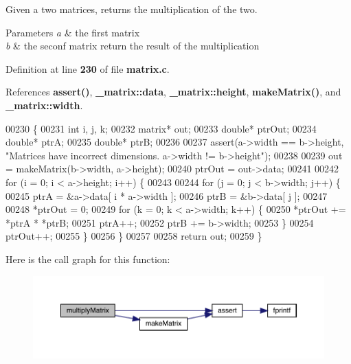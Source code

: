 Given a two matrices, returns the multiplication of the two. 


\begin{DoxyParams}{Parameters}
{\em a} & the first matrix \\
\hline
{\em b} & the seconf matrix return the result of the multiplication \\
\hline
\end{DoxyParams}


Definition at line \textbf{ 230} of file \textbf{ matrix.\+c}.



References \textbf{ assert()}, \textbf{ \+\_\+matrix\+::data}, \textbf{ \+\_\+matrix\+::height}, \textbf{ make\+Matrix()}, and \textbf{ \+\_\+matrix\+::width}.


\begin{DoxyCode}
00230                                              \{
00231     \textcolor{keywordtype}{int} i, j, k;
00232     matrix* out;
00233     \textcolor{keywordtype}{double}* ptrOut;
00234     \textcolor{keywordtype}{double}* ptrA;
00235     \textcolor{keywordtype}{double}* ptrB;
00236 
00237     assert(a->width == b->height, \textcolor{stringliteral}{"Matrices have incorrect dimensions. a->width != b->height"});
00238 
00239     out = makeMatrix(b->width, a->height);
00240     ptrOut = out->data;
00241 
00242     \textcolor{keywordflow}{for} (i = 0; i < a->height; i++) \{
00243 
00244         \textcolor{keywordflow}{for} (j = 0; j < b->width; j++) \{
00245             ptrA = &a->data[ i * a->width ];
00246             ptrB = &b->data[ j ];
00247 
00248             *ptrOut = 0;
00249             \textcolor{keywordflow}{for} (k = 0; k < a->width; k++) \{
00250                 *ptrOut += *ptrA * *ptrB;
00251                 ptrA++;
00252                 ptrB += b->width;
00253             \}
00254             ptrOut++;
00255         \}
00256     \}
00257 
00258     \textcolor{keywordflow}{return} out;
00259 \}
\end{DoxyCode}
Here is the call graph for this function\+:\nopagebreak
\begin{figure}[H]
\begin{center}
\leavevmode
\includegraphics[width=350pt]{matrix_8c_a63ed5c518b34768e9ef8e9d5f7d0b534_cgraph}
\end{center}
\end{figure}
\mbox{\label{matrix_8c_a50ab2b1ac33d6993d93522fc4f30a051}} 
